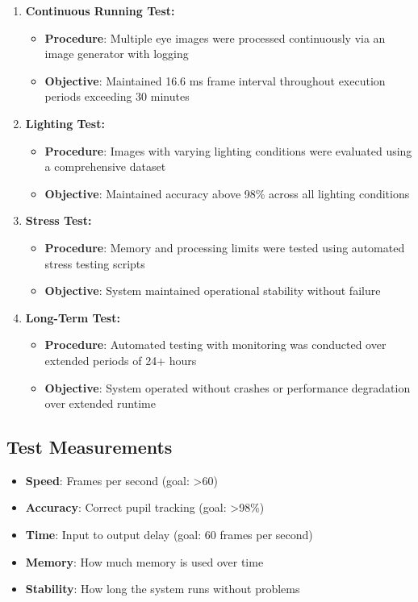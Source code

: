 \begin{enumerate}
\item \textbf{Continuous Running Test:}
   \begin{itemize}
   \item \textbf{Procedure}: Multiple eye images were processed continuously via an image generator with logging
   \item \textbf{Objective}: Maintained 16.6 ms frame interval throughout execution periods exceeding 30 minutes
   \end{itemize}

\item \textbf{Lighting Test:}
   \begin{itemize}
   \item \textbf{Procedure}: Images with varying lighting conditions were evaluated using a comprehensive dataset
   \item \textbf{Objective}: Maintained accuracy above 98\% across all lighting conditions
   \end{itemize}

\item \textbf{Stress Test:}
   \begin{itemize}
   \item \textbf{Procedure}: Memory and processing limits were tested using automated stress testing scripts
   \item \textbf{Objective}: System maintained operational stability without failure
   \end{itemize}

\item \textbf{Long-Term Test:}
   \begin{itemize}
   \item \textbf{Procedure}: Automated testing with monitoring was conducted over extended periods of 24+ hours
   \item \textbf{Objective}: System operated without crashes or performance degradation over extended runtime
   \end{itemize}
\end{enumerate}

\subsection{Test Measurements}\label{subsec:test-measurements}

\begin{itemize}
\item \textbf{Speed}: Frames per second (goal: >60)
\item \textbf{Accuracy}: Correct pupil tracking (goal: >98\%)
\item \textbf{Time}: Input to output delay (goal: 60 frames per second)
\item \textbf{Memory}: How much memory is used over time
\item \textbf{Stability}: How long the system runs without problems
\end{itemize}

